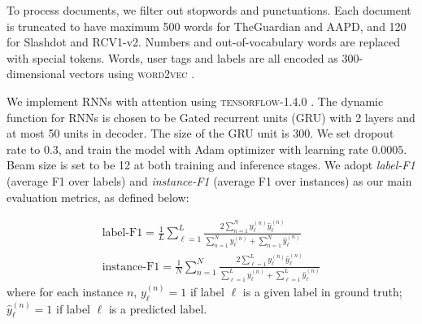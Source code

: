  To process documents, we filter out stopwords and punctuations. Each document is truncated to have maximum 500 words for TheGuardian and AAPD, and 120 for Slashdot and RCV1-v2. Numbers and out-of-vocabulary words are replaced with special tokens. Words, user tags and labels are all encoded as 300-dimensional vectors using \textsc{word2vec} \cite{DBLP:journals/corr/abs-1301-3781}.
 
 We implement RNNs with attention using \textsc{tensorflow-1.4.0} \cite{DBLP:conf/osdi/AbadiBCCDDDGIIK16}. The dynamic function for  RNNs is chosen to be Gated recurrent units (GRU) with  2 layers and at most 50 units in decoder. The  size of the GRU unit is 300. We set dropout rate to 0.3, and train the model with Adam optimizer \cite{DBLP:journals/corr/KingmaB14} with learning rate $0.0005$. Beam size is set to be 12 at both training and inference stages. We adopt \emph{label-F1} (average F1 over labels) and \emph{instance-F1} (average F1 over instances) as our main evaluation metrics, as defined below:
 
\begin{align*} \text{label-F1} = \frac{1}{L}\sum_{\ell=1}^L\frac{2\sum_{n=1}^N y^{(n)}_\ell \hat{y}^{(n)}_\ell}{\sum_{n=1}^N y^{(n)}_\ell+\sum_{n=1}^N \hat{y}^{(n)}_\ell}\\
\text{instance-F1} = \frac{1}{N}\sum_{n=1}^N\frac{2\sum_{\ell=1}^L y^{(n)}_\ell \hat{y}^{(n)}_\ell}{\sum_{\ell=1}^L y^{(n)}_\ell+\sum_{\ell=1}^L \hat{y}^{(n)}_\ell}
\end{align*}
where for each instance $n$, $y_\ell^{(n)}=1$ if label $\ell$ is a given label in ground truth; $\hat{y}_\ell^{(n)}=1$ if label $\ell$ is a predicted  label.

